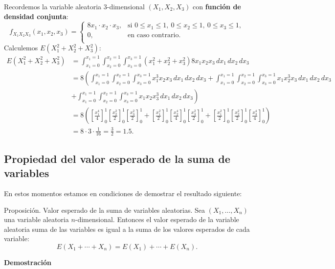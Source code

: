 \documentclass[]{book}
\begin{document}
Recordemos la variable aleatoria \(3\)-dimensional \((X_1,X_2,X_3)\) con \textbf{función de densidad conjunta}:
\[
f_{X_1X_2X_3}(x_1,x_2,x_3)=\begin{cases}
8 x_1\cdot x_2\cdot x_3, & \mbox{si }0\leq x_1\leq 1,\ 0\leq x_2\leq 1,\ 0\leq x_3\leq 1, \\
0, & \mbox{en caso contrario.}\\
\end{cases}
\]
Calculemos \(E(X_1^2+X_2^2+X_3^2)\):
\[
\begin{array}{rl}
E(X_1^2+X_2^2+X_3^2) & =\int_{x_1=0}^{x_1=1} \int_{x_2=0}^{x_2=1}\int_{x_3=0}^{x_3=1} (x_1^2+x_2^2+x_3^2) 8 x_1 x_2 x_3 \,dx_1\, dx_2\, dx_3\\ & =8\left(\int_{x_1=0}^{x_1=1} \int_{x_2=0}^{x_2=1}\int_{x_3=0}^{x_3=1}   x_1^3 x_2 x_3 \,dx_1\, dx_2\, dx_3 + \int_{x_1=0}^{x_1=1} \int_{x_2=0}^{x_2=1}\int_{x_3=0}^{x_3=1}   x_1 x_2^3 x_3 \,dx_1\, dx_2\, dx_3 \right.\\ & \left. + \int_{x_1=0}^{x_1=1} \int_{x_2=0}^{x_2=1}\int_{x_3=0}^{x_3=1}   x_1 x_2 x_3^3 \,dx_1\, dx_2\, dx_3\right) \\ & =
8\left(\left[\frac{x_1^4}{4}\right]_0^1 \left[\frac{x_2^2}{2}\right]_0^1 \left[\frac{x_3^2}{2}\right]_0^1 + \left[\frac{x_1^2}{2}\right]_0^1 \left[\frac{x_2^4}{4}\right]_0^1 \left[\frac{x_3^2}{2}\right]_0^1 + \left[\frac{x_1^2}{2}\right]_0^1 \left[\frac{x_2^2}{2}\right]_0^1 \left[\frac{x_3^4}{4}\right]_0^1\right) \\ & =8\cdot 3\cdot \frac{1}{16}=\frac{3}{2}=1.5.
\end{array}
\]

\hypertarget{propiedad-del-valor-esperado-de-la-suma-de-variables}{%
\subsection{Propiedad del valor esperado de la suma de variables}\label{propiedad-del-valor-esperado-de-la-suma-de-variables}}

En estos momentos estamos en condiciones de demostrar el resultado siguiente:

Proposición. Valor esperado de la suma de variables aleatorias.
Sea \((X_1,\ldots,X_n)\) una variable aleatoria \(n\)-dimensional. Entonces el valor esperado de la variable aleatoria suma de las variables es igual a la suma de los valores esperados de cada variable:
\[
E(X_1+\cdots + X_n)=E(X_1)+\cdots + E(X_n).
\]

\textbf{Demostración}
\end{document}
